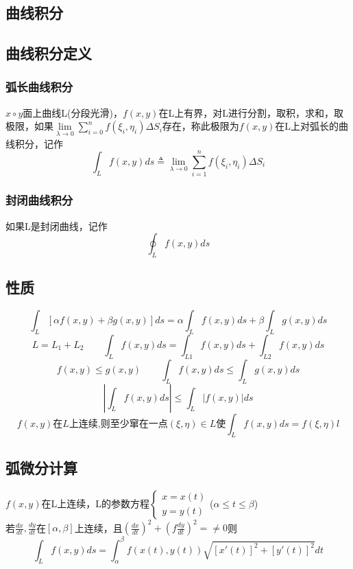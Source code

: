 \begin{center}\section{曲线积分}\label{chapter_curvilinear_integral}\end{center}
\subsection{曲线积分定义}
\subsubsection{弧长曲线积分}
$x\circ y$面上曲线L(分段光滑)，$f(x,y)$在L上有界，对L进行分割，取积，求和，取极限，如果$\lim\limits_{\lambda\to 0}\sum\limits_{i=0}^{n}f(\xi_i,\eta_i)\Delta S_i$存在，称此极限为$f(x,y)$在L上对弧长的曲线积分，记作
$$\int_{L}f(x,y)ds\triangleq \lim\limits_{\lambda\to 0}\sum\limits_{i=1}^{n}f(\xi_i,\eta_i)\Delta S_i$$
\subsubsection{封闭曲线积分}
如果L是封闭曲线，记作\\
$$\oint_Lf(x,y)ds$$
\subsection{性质}
$$\int_L[\alpha f(x,y)+\beta g(x,y)]ds=\alpha\int_L f(x,y)ds+\beta\int_L g(x,y)ds$$
$$L=L_1+L_2\qquad \int_L f(x,y)ds=\int_{L1} f(x,y)ds+\int_{L2} f(x,y)ds$$
$$f(x,y)\leqslant g(x,y)\qquad \int_L f(x,y)ds\leqslant \int_L g(x,y)ds$$
$$\left|\int_L f(x,y)ds\right|\leqslant \int_L|f(x,y)|ds$$
$$f(x,y)\mbox{在}L\mbox{上连续,则至少窜在一点}(\xi,\eta)\in L\mbox{使}\int_L f(x,y)ds=f(\xi,\eta)l$$
\subsection{弧微分计算}
$f(x,y)$在L上连续，L的参数方程$\begin{cases}
	x=x(t)\\
	y=y(t)
\end{cases}$\quad ($\alpha\leqslant t\leqslant \beta$)\\
若$\frac{dx}{dt},\frac{dy}{dt}$在$[\alpha,\beta]$上连续，且$\left(\frac{dx}{dt}\right)^2+\left(f\frac{dy}{dt}\right)^2=\neq 0$则\\
$$\int_{L}f(x,y)ds=\int_{\alpha}^{\beta}f(x(t),y(t))\sqrt{[x'(t)]^2+[y'(t)]^2}dt$$